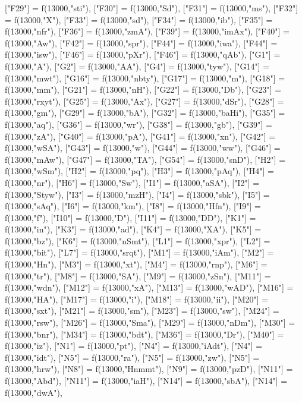 \documentclass{article}
\begin{document}
\begin{luacode*}
{	["F29"] = f(13000,"sti"),
	["F30"] = f(13000,"Sd"),
	["F31"] = f(13000,"ms"),
	["F32"] = f(13000,"X"),
	["F33"] = f(13000,"sd"),
	["F34"] = f(13000,"ib"),
	["F35"] = f(13000,"nfr"),
	["F36"] = f(13000,"zmA"),
	["F39"] = f(13000,"imAx"),
	["F40"] = f(13000,"Aw"),
	["F42"] = f(13000,"spr"),
	["F44"] = f(13000,"iwa"),
	["F44"] = f(13000,"isw"),
	["F46"] = f(13000,"pXr"),
	["F46"] = f(13000,"qAb"),
	["G1"] = f(13000,"A"),
	["G2"] = f(13000,"AA"),
	["G4"] = f(13000,"tyw"),
	["G14"] = f(13000,"mwt"),
	["G16"] = f(13000,"nbty"),
	["G17"] = f(13000,"m"),
	["G18"] = f(13000,"mm"),
	["G21"] = f(13000,"nH"),
	["G22"] = f(13000,"Db"),
	["G23"] = f(13000,"rxyt"),
	["G25"] = f(13000,"Ax"),
	["G27"] = f(13000,"dSr"),	
	["G28"] = f(13000,"gm"),
	["G29"] = f(13000,"bA"),
	["G32"] = f(13000,"baHi"),
	["G35"] = f(13000,"aq"),
	["G36"] = f(13000,"wr"),
	["G38"] = f(13000,"gb"),
	["G39"] = f(13000,"zA"),
	["G40"] = f(13000,"pA"),
	["G41"] = f(13000,"xn"),
	["G42"] = f(13000,"wSA"),
	["G43"] = f(13000,"w"),
	["G44"] = f(13000,"ww"),
	["G46"] = f(13000,"mAw"),
	["G47"] = f(13000,"TA"),
	["G54"] = f(13000,"snD"),
	["H2"] = f(13000,"wSm"),
	["H2"] = f(13000,"pq"),
	["H3"] = f(13000,"pAq"),
	["H4"] = f(13000,"nr"),
	["H6"] = f(13000,"Sw"),
	["I1"] = f(13000,"aSA"),
	["I2"] = f(13000,"Styw"),
	["I3"] = f(13000,"mzH"),
	["I4"] = f(13000,"sbk"),
	["I5"] = f(13000,"sAq"),
	["I6"] = f(13000,"km"),
	["I8"] = f(13000,"Hfn"),
	["I9"] = f(13000,"f"),
	["I10"] = f(13000,"D"),
	["I11"] = f(13000,"DD"),
	["K1"] = f(13000,"in"),
	["K3"] = f(13000,"ad"),
	["K4"] = f(13000,"XA"),
	["K5"] = f(13000,"bz"),
	["K6"] = f(13000,"nSmt"),
	["L1"] = f(13000,"xpr"),
	["L2"] = f(13000,"bit"),
	["L7"] = f(13000,"srqt"),
	["M1"] = f(13000,"iAm"),
	["M2"] = f(13000,"Hn"),
	["M3"] = f(13000,"xt"),
	["M4"] = f(13000,"rnp"),
	["M6"] = f(13000,"tr"),
	["M8"] = f(13000,"SA"),
	["M9"] = f(13000,"zSn"),
	["M11"] = f(13000,"wdn"),
	["M12"] = f(13000,"xA"),
	["M13"] = f(13000,"wAD"),
	["M16"] = f(13000,"HA"),
	["M17"] = f(13000,"i"),
	["M18"] = f(13000,"ii"),
	["M20"] = f(13000,"sxt"),
	["M21"] = f(13000,"sm"),
	["M23"] = f(13000,"sw"),
	["M24"] = f(13000,"rsw"),
	["M26"] = f(13000,"Sma"),
	["M29"] = f(13000,"nDm"),
	["M30"] = f(13000,"bnr"),
	["M34"] = f(13000,"bdt"),
	["M36"] = f(13000,"Dr"),
	["M40"] = f(13000,"iz"),
	["N1"] = f(13000,"pt"),
	["N4"] = f(13000,"iAdt"),
	["N4"] = f(13000,"idt"),
	["N5"] = f(13000,"ra"),
	["N5"] = f(13000,"zw"),
	["N5"] = f(13000,"hrw"),
	["N8"] = f(13000,"Hnmmt"),
	["N9"] = f(13000,"pzD"),
	["N11"] = f(13000,"Abd"),
	["N11"] = f(13000,"iaH"),
	["N14"] = f(13000,"sbA"),
	["N14"] = f(13000,"dwA"),
}
\end{luacode*}
\end{document}
